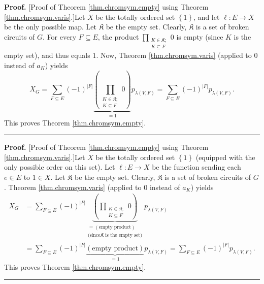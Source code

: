\documentclass[numbers=enddot,12pt,final,onecolumn,notitlepage]{scrartcl}%
\theoremstyle{definition}
\newenvironment{proof}[1][Proof]{\noindent\textbf{#1.} }{\ \rule{0.5em}{0.5em}}
\newenvironment{verlong}{}{}
\newenvironment{vershort}{}{}
\let\sumnonlimits\sum
\let\prodnonlimits\prod
\renewcommand{\sum}{\sumnonlimits\limits}
\renewcommand{\prod}{\prodnonlimits\limits}
\begin{document}
\begin{vershort}
\begin{proof}
[Proof of Theorem \ref{thm.chromsym.empty} using Theorem
\ref{thm.chromsym.varis}.]Let $X$ be the totally ordered set $\left\{
1\right\}  $, and let $\ell:E\rightarrow X$ be the only possible map. Let
$\mathfrak{K}$ be the empty set. Clearly, $\mathfrak{K}$ is a set of broken
circuits of $G$. For every $F\subseteq E$, the product $\prod_{\substack{K\in
\mathfrak{K};\\K\subseteq F}}0$ is empty (since $K$ is the empty set), and
thus equals $1$. Now, Theorem \ref{thm.chromsym.varis} (applied to $0$ instead
of $a_{K}$) yields%
\[
X_{G}=\sum_{F\subseteq E}\left(  -1\right)  ^{\left\vert F\right\vert
}\underbrace{\left(  \prod_{\substack{K\in\mathfrak{K};\\K\subseteq
F}}0\right)  }_{=1}p_{\lambda\left(  V,F\right)  }=\sum_{F\subseteq E}\left(
-1\right)  ^{\left\vert F\right\vert }p_{\lambda\left(  V,F\right)  }.
\]
This proves Theorem \ref{thm.chromsym.empty}.
\end{proof}
\end{vershort}

\begin{verlong}
\begin{proof}
[Proof of Theorem \ref{thm.chromsym.empty} using Theorem
\ref{thm.chromsym.varis}.]Let $X$ be the totally ordered set $\left\{
1\right\}  $ (equipped with the only possible order on this set). Let
$\ell:E\rightarrow X$ be the function sending each $e\in E$ to $1\in X$. Let
$\mathfrak{K}$ be the empty set. Clearly, $\mathfrak{K}$ is a set of broken
circuits of $G$. Theorem \ref{thm.chromsym.varis} (applied to $0$ instead of
$a_{K}$) yields%
\begin{align*}
X_{G}  &  =\sum_{F\subseteq E}\left(  -1\right)  ^{\left\vert F\right\vert
}\underbrace{\left(  \prod_{\substack{K\in\mathfrak{K};\\K\subseteq
F}}0\right)  }_{\substack{=\left(  \text{empty product}\right)  \\\text{(since
}\mathfrak{K}\text{ is the empty set)}}}p_{\lambda\left(  V,F\right)  }\\
&  =\sum_{F\subseteq E}\left(  -1\right)  ^{\left\vert F\right\vert
}\underbrace{\left(  \text{empty product}\right)  }_{=1}p_{\lambda\left(
V,F\right)  }=\sum_{F\subseteq E}\left(  -1\right)  ^{\left\vert F\right\vert
}p_{\lambda\left(  V,F\right)  }.
\end{align*}
This proves Theorem \ref{thm.chromsym.empty}.
\end{proof}
\end{verlong}
\end{document}

